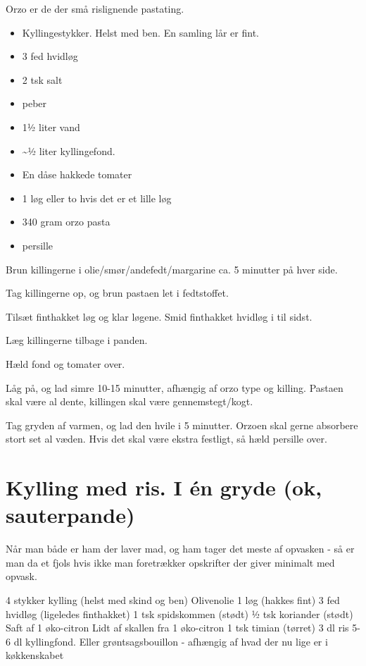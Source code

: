 \documentclass[
]{book}
\providecommand{\tightlist}{%
  \setlength{\itemsep}{0pt}\setlength{\parskip}{0pt}}
\begin{document}
Orzo er de der små rislignende pastating.

\begin{itemize}
\tightlist
\item
  Kyllingestykker. Helst med ben. En samling lår er fint.
\item
  3 fed hvidløg
\item
  2 tsk salt
\item
  peber
\item
  1½ liter vand
\item
  \textasciitilde½ liter kyllingefond.
\item
  En dåse hakkede tomater
\item
  1 løg eller to hvis det er et lille løg
\item
  340 gram orzo pasta
\item
  persille
\end{itemize}

Brun killingerne i olie/smør/andefedt/margarine
ca. 5 minutter på hver side.

Tag killingerne op, og brun pastaen let i fedtstoffet.

Tilsæt finthakket løg og klar løgene. Smid finthakket hvidløg i til sidst.

Læg killingerne tilbage i panden.

Hæld fond og tomater over.

Låg på, og lad simre 10-15 minutter, afhængig af orzo type og killing.
Pastaen skal være al dente, killingen skal være gennemstegt/kogt.

Tag gryden af varmen, og lad den hvile i 5 minutter. Orzoen skal gerne absorbere
stort set al væden. Hvis det skal være ekstra festligt, så hæld persille over.

\section{Kylling med ris. I én gryde (ok, sauterpande)}\label{kylling-med-ris.-i-uxe9n-gryde-ok-sauterpande}

Når man både er ham der laver mad, og ham tager det meste af opvasken - så er man da et fjols hvis ikke man foretrækker opskrifter der giver minimalt med opvask.

4 stykker kylling (helst med skind og ben)
Olivenolie
1 løg (hakkes fint)
3 fed hvidløg (ligeledes finthakket)
1 tsk spidskommen (stødt)
½ tsk koriander (stødt)
Saft af 1 øko-citron
Lidt af skallen fra 1 øko-citron
1 tsk timian (tørret)
3 dl ris
5-6 dl kyllingfond. Eller grøntsagsbouillon - afhængig af hvad der nu lige er i køkkenskabet
\end{document}
